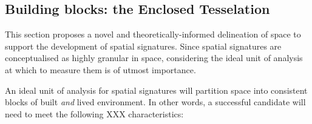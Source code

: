 \subsection{Building blocks: the Enclosed Tesselation}
\label{ssec:ss_et}

This section proposes a novel and theoretically-informed delineation of space
to support the development of spatial signatures.
Since spatial signatures are conceptualised as highly granular in space,
considering the ideal unit of analysis at which to measure them is of utmost
importance.

An ideal unit of analysis for spatial signatures will partition space into
consistent blocks of built \textit{and} lived environment. In other words, a
successful candidate will need to meet the following XXX characteristics:





